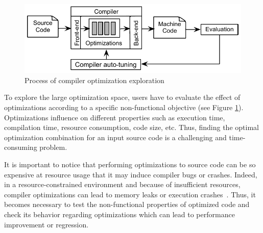 \begin{figure}[ht]
	\centering
	\includegraphics[width=0.75\linewidth]{chapitre3/fig/autotuning.pdf}
	\caption{Process of compiler optimization exploration}
	\label{fig:autotuning.pdf}
\end{figure}

To explore the large optimization space, users have to evaluate the effect of optimizations according to a specific non-functional objective (see Figure \ref{fig:autotuning.pdf}). Optimizations influence on different properties such as execution time, compilation time, resource consumption, code size, etc.
Thus, finding the optimal optimization combination for an input source code is a challenging and time-consuming problem. 

It is important to notice that performing optimizations to source code can be so expensive at resource usage that it may induce compiler bugs or crashes. 
Indeed, in a resource-constrained environment and because of insufficient resources, compiler optimizations can lead to memory leaks or execution crashes~\cite{yang2011finding}. 
Thus, it becomes necessary to test the non-functional properties of optimized code and check its behavior regarding optimizations which can lead to performance improvement or regression.





